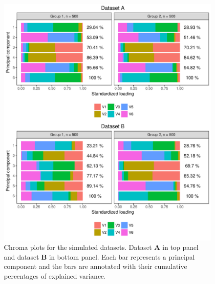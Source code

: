 \documentclass[a4paper,12pt]{article}
\begin{document}
\begin{figure}[H]
\center
\includegraphics[scale=0.8]{Figure4_v2.pdf}
\caption{Chroma plots for the simulated datasets. Dataset $\mathbf{A}$ in top panel and dataset $\mathbf{B}$ in bottom panel. Each bar represents a principal component and the bars are annotated with their cumulative percentages of explained variance.}
\label{plot.simChroma}
\end{figure}
\end{document}
